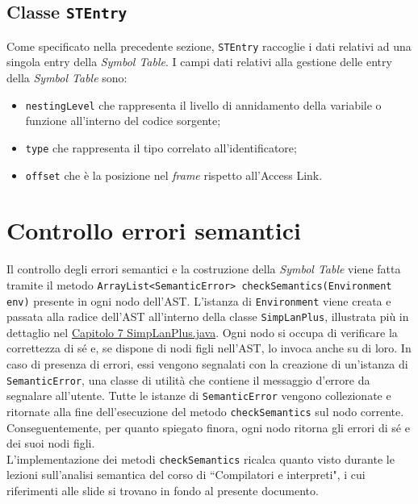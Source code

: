 \documentclass[../report.tex]{subfiles}
\begin{document}
\subsection[Classe STEntry]{Classe \texttt{STEntry}}\label{ss:stentry}
Come specificato nella precedente sezione, \verb|STEntry| raccoglie i dati relativi ad una singola entry della \textit{Symbol Table}.
I campi dati relativi alla gestione delle entry della \textit{Symbol Table} sono:
\begin{itemize}
    \item \verb|nestingLevel| che rappresenta il livello di annidamento della variabile o funzione all'interno del codice sorgente;
    \item \verb|type| che rappresenta il tipo correlato all'identificatore;
    \item \verb|offset| che è la posizione nel \textit{frame} rispetto all'Access Link.
\end{itemize}

\section{Controllo errori semantici}\label{s:controllo-errori-semantici}
Il controllo degli errori semantici e la costruzione della \textit{Symbol Table} viene fatta tramite il metodo \verb|ArrayList<SemanticError> checkSemantics(Environment env)| presente in ogni nodo dell'AST.
L'istanza di \verb|Environment| viene creata e passata alla radice dell'AST all'interno della classe \verb|SimpLanPlus|, illustrata più in dettaglio nel \hyperref[c:simplanplus-java]{Capitolo 7 SimpLanPlus.java}.
Ogni nodo si occupa di verificare la correttezza di sé e, se dispone di nodi figli nell'AST, lo invoca anche su di loro.
In caso di presenza di errori, essi vengono segnalati con la creazione di un'istanza di \verb|SemanticError|, una classe di utilità che contiene il messaggio d'errore da segnalare all'utente.
Tutte le istanze di \verb|SemanticError| vengono collezionate e ritornate alla fine dell'esecuzione del metodo \verb|checkSemantics| sul nodo corrente.
Conseguentemente, per quanto spiegato finora, ogni nodo ritorna gli errori di sé e dei suoi nodi figli.\\
\noindent
L'implementazione dei metodi \verb|checkSemantics| ricalca quanto visto durante le lezioni sull'analisi semantica del corso di ``Compilatori e interpreti", i cui riferimenti alle slide si trovano in fondo al presente documento.
\end{document}
